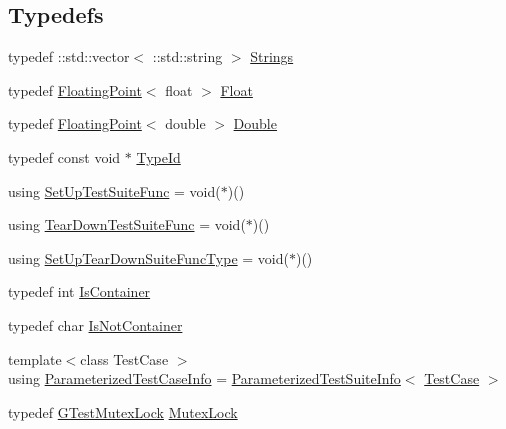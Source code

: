 \subsection*{Typedefs}
\begin{DoxyCompactItemize}
\item 
typedef \+::std\+::vector$<$ \+::std\+::string $>$ \mbox{\hyperlink{namespacetesting_1_1internal_a4ad7524c75dfadde584df6d5b4742aa8}{Strings}}
\item 
typedef \mbox{\hyperlink{classtesting_1_1internal_1_1_floating_point}{Floating\+Point}}$<$ float $>$ \mbox{\hyperlink{namespacetesting_1_1internal_a97de600d6dbfffe7091b878ac4b3a9a7}{Float}}
\item 
typedef \mbox{\hyperlink{classtesting_1_1internal_1_1_floating_point}{Floating\+Point}}$<$ double $>$ \mbox{\hyperlink{namespacetesting_1_1internal_a92debc9f055b7e7e1e4e861c5ae1c67a}{Double}}
\item 
typedef const void $\ast$ \mbox{\hyperlink{namespacetesting_1_1internal_a38c435cbab5f8b784e2e7f3356cab242}{Type\+Id}}
\item 
using \mbox{\hyperlink{namespacetesting_1_1internal_a028e9455ad22171feabf84fe46329c92}{Set\+Up\+Test\+Suite\+Func}} = void($\ast$)()
\item 
using \mbox{\hyperlink{namespacetesting_1_1internal_ab58aba5acd47d329b72a1d10c7b61648}{Tear\+Down\+Test\+Suite\+Func}} = void($\ast$)()
\item 
using \mbox{\hyperlink{namespacetesting_1_1internal_a754d337f5d643225115fb28f6b1d6fb1}{Set\+Up\+Tear\+Down\+Suite\+Func\+Type}} = void($\ast$)()
\item 
typedef int \mbox{\hyperlink{namespacetesting_1_1internal_ad8f0c2883245f1df2a53618a49f0deb3}{Is\+Container}}
\item 
typedef char \mbox{\hyperlink{namespacetesting_1_1internal_abf080521ce135deb510e0a7830fd3d33}{Is\+Not\+Container}}
\item 
{\footnotesize template$<$class Test\+Case $>$ }\\using \mbox{\hyperlink{namespacetesting_1_1internal_aac31682b6b41997d6cc610a5787dc8bc}{Parameterized\+Test\+Case\+Info}} = \mbox{\hyperlink{classtesting_1_1internal_1_1_parameterized_test_suite_info}{Parameterized\+Test\+Suite\+Info}}$<$ \mbox{\hyperlink{classtesting_1_1_test_case}{Test\+Case}} $>$
\item 
typedef \mbox{\hyperlink{classtesting_1_1internal_1_1_g_test_mutex_lock}{G\+Test\+Mutex\+Lock}} \mbox{\hyperlink{namespacetesting_1_1internal_a08b187c6cc4e28400aadf9a32fccc8de}{Mutex\+Lock}}

\end{DoxyCompactItemize}
